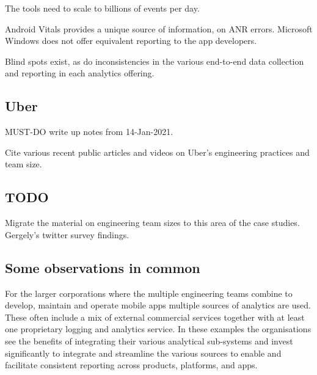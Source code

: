 The tools need to scale to billions of events per day.

Android Vitals provides a unique source of information, on ANR errors. Microsoft Windows does not offer equivalent reporting to the app developers. %

Blind spots exist, as do inconsistencies in the various end-to-end data collection and reporting in each analytics offering. 

\subsection{Uber}
MUST-DO write up notes from 14-Jan-2021.

Cite various recent public articles and videos on Uber's engineering practices and team size.

\subsection{TODO}
Migrate the material on engineering team sizes to this area of the case studies. Gergely's twitter survey findings.

\subsection{Some observations in common}
For the larger corporations where the multiple engineering teams combine to develop, maintain and operate mobile apps multiple sources of analytics are used. These often include a mix of external commercial services together with at least one proprietary logging and analytics service. In these examples the organisations see the benefits of integrating their various analytical sub-systems and invest significantly to integrate and streamline the various sources to enable and facilitate consistent reporting across products, platforms, and apps.
